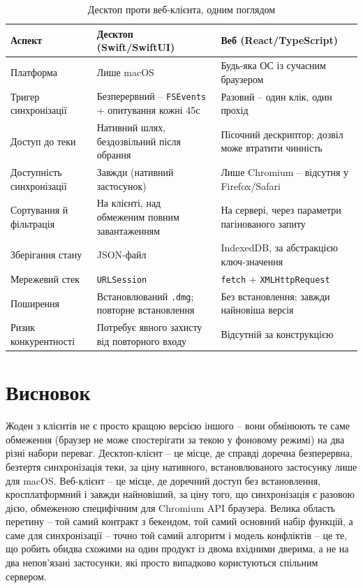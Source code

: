 \documentclass[12pt,a4paper]{article}
\begin{document}
\small
\renewcommand{\arraystretch}{1.3}
\begin{longtable}{@{}p{2.7cm}p{6.35cm}p{6.35cm}@{}}
\caption{Десктоп проти веб-клієнта, одним поглядом}
\label{tab:summary} \\
\toprule
\textbf{Аспект} & \textbf{Десктоп (Swift/SwiftUI)} & \textbf{Веб (React/TypeScript)} \\
\midrule
\endhead
Платформа & Лише macOS & Будь-яка ОС із сучасним браузером \\
Тригер синхронізації & Безперервний -- \texttt{FSEvents} + опитування кожні 45с & Разовий -- один клік, один прохід \\
Доступ до теки & Нативний шлях, бездозвільний після обрання & Пісочний дескриптор; дозвіл може втратити чинність \\
Доступність синхронізації & Завжди (нативний застосунок) & Лише Chromium -- відсутня у Firefox/Safari \\
Сортування й фільтрація & На клієнті, над обмеженим повним завантаженням & На сервері, через параметри пагінованого запиту \\
Зберігання стану & JSON-файл & IndexedDB, за абстракцією ключ-значення \\
Мережевий стек & \texttt{URLSession} & \texttt{fetch} + \texttt{XMLHttpRequest} \\
Поширення & Встановлюваний \texttt{.dmg}; повторне встановлення & Без встановлення; завжди найновіша версія \\
Ризик конкурентності & Потребує явного захисту від повторного входу & Відсутній за конструкцією \\
\bottomrule
\end{longtable}
\renewcommand{\arraystretch}{1}

\section{Висновок}

Жоден з клієнтів не є просто кращою версією іншого -- вони обмінюють те саме обмеження (браузер не може спостерігати за текою у фоновому режимі) на два різні набори переваг. Десктоп-клієнт -- це місце, де справді доречна безперервна, безтертя синхронізація теки, за ціну нативного, встановлюваного застосунку лише для macOS. Веб-клієнт -- це місце, де доречний доступ без встановлення, кросплатформний і завжди найновіший, за ціну того, що синхронізація є разовою дією, обмеженою специфічним для Chromium API браузера. Велика область перетину -- той самий контракт з бекендом, той самий основний набір функцій, а саме для синхронізації -- точно той самий алгоритм і модель конфліктів -- це те, що робить обидва схожими на один продукт із двома вхідними дверима, а не на два непов'язані застосунки, які просто випадково користуються спільним сервером.
\end{document}
